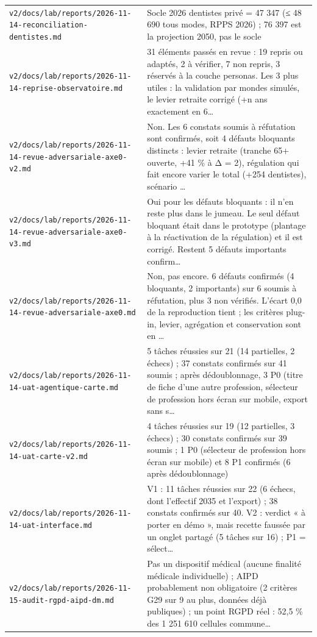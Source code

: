 \begin{small}
\begin{longtable}{@{}p{}p{}@{}}
\texttt{v2/docs/lab/reports/2026-11-14-reconciliation-dentistes.md} & Socle 2026 dentistes privé = 47 347 (≤ 48 690 tous modes, RPPS 2026) ; 76 397 est la projection 2050, pas le socle \\
\texttt{v2/docs/lab/reports/2026-11-14-reprise-observatoire.md} & 31 éléments passés en revue : 19 repris ou adaptés, 2 à vérifier, 7 non repris, 3 réservés à la couche personas. Les 3 plus utiles : la validation par mondes simulés, le levier retraite corrigé (+n ans exactement en 6… \\
\texttt{v2/docs/lab/reports/2026-11-14-revue-adversariale-axe0-v2.md} & Non. Les 6 constats soumis à réfutation sont confirmés, soit 4 défauts bloquants distincts : levier retraite (tranche 65+ ouverte, +41 \% à Δ = 2), régulation qui fait encore varier le total (+254 dentistes), scénario … \\
\texttt{v2/docs/lab/reports/2026-11-14-revue-adversariale-axe0-v3.md} & Oui pour les défauts bloquants : il n'en reste plus dans le jumeau. Le seul défaut bloquant était dans le prototype (plantage à la réactivation de la régulation) et il est corrigé. Restent 5 défauts importants confirm… \\
\texttt{v2/docs/lab/reports/2026-11-14-revue-adversariale-axe0.md} & Non, pas encore. 6 défauts confirmés (4 bloquants, 2 importants) sur 6 soumis à réfutation, plus 3 non vérifiés. L'écart 0,0 de la reproduction tient ; les critères plug-in, levier, agrégation et conservation sont en … \\
\texttt{v2/docs/lab/reports/2026-11-14-uat-agentique-carte.md} & 5 tâches réussies sur 21 (14 partielles, 2 échecs) ; 37 constats confirmés sur 41 soumis ; après dédoublonnage, 3 P0 (titre de fiche d'une autre profession, sélecteur de profession hors écran sur mobile, export sans s… \\
\texttt{v2/docs/lab/reports/2026-11-14-uat-carte-v2.md} & 4 tâches réussies sur 19 (12 partielles, 3 échecs) ; 30 constats confirmés sur 39 soumis ; 1 P0 (sélecteur de profession hors écran sur mobile) et 8 P1 confirmés (6 après dédoublonnage) \\
\texttt{v2/docs/lab/reports/2026-11-14-uat-interface.md} & V1 : 11 tâches réussies sur 22 (6 échecs, dont l'effectif 2035 et l'export) ; 38 constats confirmés sur 40. V2 : verdict « à porter en démo », mais recette faussée par un onglet partagé (5 tâches sur 16) ; P1 = sélect… \\
\texttt{v2/docs/lab/reports/2026-11-15-audit-rgpd-aipd-dm.md} & Pas un dispositif médical (aucune finalité médicale individuelle) ; AIPD probablement non obligatoire (2 critères G29 sur 9 au plus, données déjà publiques) ; un point RGPD réel : 52,5 \% des 1 251 610 cellules commune… \\

\end{longtable}
\end{small}
